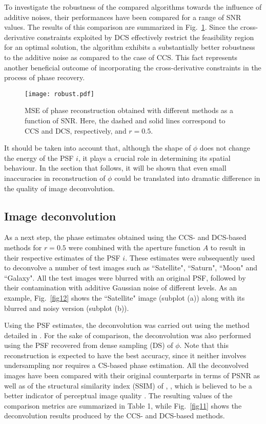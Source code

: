 \pdfoutput=1 \documentclass[journal]{IEEEtran}
\begin{document}
To investigate the robustness of the compared algorithms towards the influence of additive noises, their performances have been compared for a range of SNR values. The results of this comparison are summarized in Fig.~\ref{F6}. Since the cross-derivative constraints exploited by DCS effectively restrict the feasibility region for an optimal solution, the algorithm exhibits a substantially better robustness to the additive noise as compared to the case of CCS. This fact represents another beneficial outcome of incorporating the cross-derivative constraints in the process of phase recovery.

\begin{figure}[!t]
\centering
\texttt{[image: robust.pdf]}
\caption{MSE of phase reconstruction obtained with different methods as a function of SNR. Here, the dashed and solid lines correspond to CCS and DCS, respectively, and $r=0.5$.}
\label{F6}
\end{figure}

It should be taken into account that, although the shape of $\phi$ does not change the energy of the PSF $i$, it plays a crucial role in determining its spatial behaviour. In the section that follows, it will be shown that even small inaccuracies in reconstruction of $\phi$ could be translated into dramatic  difference in the quality of image deconvolution.

\subsection{Image deconvolution}
As a next step, the phase estimates obtained using the CCS- and DCS-based methods for $r=0.5$ were combined with the aperture function $A$ to result in their respective estimates of the PSF $i$. These estimates were subsequently used to deconvolve a number of test images such as ``Satellite", ``Saturn", ``Moon" and ``Galaxy". All the test images were blurred with an original PSF, followed by their contamination with additive Gaussian noise of different levels. As an example, Fig.~\ref{fig12} shows the ``Satellite" image (subplot (a)) along with its blurred and noisy version (subplot (b)).

Using the PSF estimates, the deconvolution was carried out using the method detailed in \cite{11}. For the sake of comparison, the deconvolution was also performed using the PSF recovered from dense sampling (DS) of $\phi$. Note that this reconstruction is expected to have the best accuracy, since it neither involves undersampling nor requires a CS-based phase estimation. All the deconvolved images have been compared with their original counterparts in terms of PSNR as well as of the structural similarity index (SSIM) of \cite{36}, , which is believed to be a better indicator of perceptual image quality \cite{100}. The resulting values of the comparison metrics are summarized in Table 1, while Fig.~\ref{fig11} shows the deconvolution results produced by the CCS- and DCS-based methods.
\end{document}
